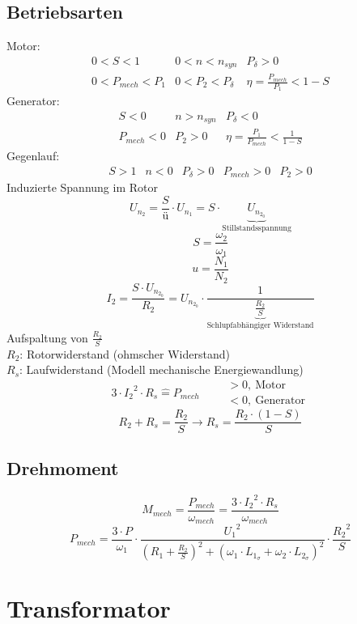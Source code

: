 \subsection{Betriebsarten}
Motor: 
\[ \begin{array}{llllll}
0 < S < 1 
  & 0 < n < n_{syn} 
  & P_\delta > 0 
  \\ 0 < P_{mech} < P_1 
  & 0 < P_2 < P_\delta 
  & \eta = \frac{P_{mech}}{P_1} < 1 - S
\end{array} \]
Generator: 
\[ \begin{array}{llllll}
S < 0 
  & n > n_{syn} 
  & P_\delta < 0 
  \\ P_{mech} < 0 
  & P_2 > 0
  & \eta = \frac{P_1}{P_{mech}} < \frac{1}{1 - S}
\end{array} \]
Gegenlauf: 
\[ \begin{array}{llllll}
S > 1 
  & n < 0
  & P_\delta > 0 
  & P_{mech} > 0
  & P_2 > 0
\end{array} \]
Induzierte Spannung im Rotor
\[ U_{n_2} = \frac{S}{ü} \cdot U_{n_1} = S \cdot \underbrace{U_{n_{2_0}}}_
{\text{Stillstandsspannung}} \]
\[ S = \frac{\omega_2}{\omega_1} \]
\[ u = \frac{N_1}{N_2} \]
\[ I_2 = \frac{S \cdot U_{n_{2_0}}}{R_2} = U_{n_{2_0}} \cdot 
\frac{1}{\underbrace{\frac{R_2}{S}}_{\text{Schlupfabhängiger Widerstand}}} \]
Aufspaltung von $\frac{R_2}{S}$\\
$R_2$: Rotorwiderstand (ohmscher Widerstand)\\
$R_s$: Laufwiderstand (Modell mechanische Energiewandlung)
\[ 3 \cdot {I_2}^2 \cdot R_s \hat{=} P_{mech} 
\qquad \begin{array}{l}>0,~\text{Motor}\\<0,~\text{Generator}\end{array} \]
\[ R_2 + R_s = \frac{R_2}{S} \rightarrow R_s = \frac{R_2 \cdot (1 - S)}{S} \]

\subsection{Drehmoment}
\[ M_{mech} = \frac{P_{mech}}{\omega_{mech}} 
= \frac{3 \cdot {I_2}^2 \cdot R_s}{\omega_{mech}} \]
\[ P_{mech} = \frac{3 \cdot P}{\omega_1} \cdot 
\frac{{U_1}^2}{\left(R_1 + \frac{R_2}{S}\right)^2 + 
(\omega_1 \cdot L_{1_\sigma} + \omega_2 \cdot L_{2_\sigma})^2} \cdot 
\frac{{R_2}^2}{S} \]

\section{Transformator}

